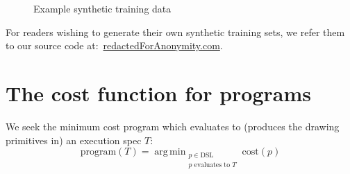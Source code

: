 \documentclass{article}
\DeclareMathOperator*{\argmin}{arg\,min} %
\DeclareMathOperator{\argmin}{argmin} %
\begin{document}
\begin{figure}
      \begin{minipage}[t]{2.2cm}\end{minipage}
      \begin{minipage}[t]{2.2cm}\end{minipage}
      \begin{minipage}[t]{2.2cm}\end{minipage}
      \begin{minipage}[t]{2.2cm}\end{minipage}
      \caption{Example synthetic training data}\label{exampleTrainingData}
\end{figure}

For readers wishing to generate their own synthetic training sets,
we refer them to our source code at:~\url{redactedForAnonymity.com}.%

\section{The cost function for programs}

We seek the minimum cost program which evaluates to (produces the drawing primitives in) an execution spec $T$:
\begin{equation}
  \text{program}(T) = \argmin_{\substack{p\in \text{DSL}\\p \text{ evaluates to } T}} \text{cost}(p)\label{programObjective}
\end{equation}
\end{document}
